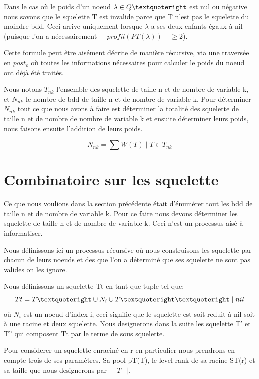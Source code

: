 \documentclass[french]{article}
\begin{document}
Dans le cas où le poids d'un noeud \(\lambda \in Q\textquoteright\) est nul ou négative nous savons que le squelette T est invalide parce que T n'est pas le squelette du moindre bdd. Ceci arrive uniquement lorsque \(\lambda\) a ses deux enfants égaux à nil (puisque l'on a nécessairement \(\mid\mid profil(PT(\lambda)) \mid\mid \geq\)2).

Cette formule peut être aisément décrite de manière récursive, via une traversée en \(post_{o}\) où toutes les informations nécessaires pour calculer le poids du noeud ont déjà été traités.
\vspace{5mm} 

Nous notons \(T_{nk}\) l'ensemble des squelette de taille n et de nombre de variable k, et \(N_{nk}\) le nombre de bdd de taille n et de nombre de variable k.
Pour déterminer \(N_{nk}\) tout ce que nous avons à faire est déterminer la totalité des squelette de taille n et de nombre de nombre de variable k et ensuite déterminer leurs poids, nous faisons ensuite l'addition de leurs poids.

\[N_{nk} = \sum W(T) \mid T \in T_{nk}\]

\section{Combinatoire sur les squelette}
Ce que nous voulions dans la section précédente était d'énumérer tout les bdd de taille n et de nombre de variable k. Pour ce faire nous devons déterminer les squelette de taille n et de nombre de variable k. Ceci n'est un processus aisé à informatiser.

Nous définissons ici un processus récursive où nous construisons les squelette par chacun de leurs noeuds et des que l'on a déterminé que ses squelette ne sont pas valides on les ignore. 
\vspace{5mm} 

Nous définissons un squelette Tt en tant que tuple tel que:
\[Tt = T\textquoteright \cup N_i \cup T\textquoteright\textquoteright \mid nil \]
où \(N_i\) est un noeud d'index i, ceci signifie que le squelette est soit reduit à nil soit à une racine et deux squelette. Nous designerons dans la suite les squelette T' et T'' qui composent Tt par le terme de sous squelette.

Pour considerer un squelette enraciné en r en particulier nous prendrons en compte trois de ses paramètres. Sa pool pT(T), le level rank de sa racine ST(r) et sa taille que nous designerons par \(\mid\mid T\mid\mid\).
\end{document}
